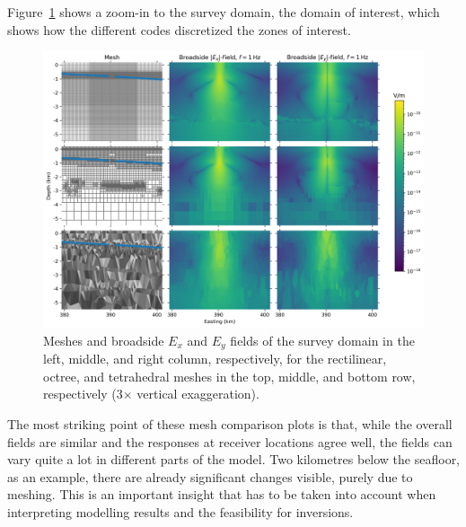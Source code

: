 \documentclass[extra, camera,%
]{gji}
\newlength{\fwidth}
\begin{document}
Figure~\ref{fig:results-marlim_survey} shows a zoom-in to the survey domain, the domain of interest, which shows how the different codes discretized the zones of interest.
%
\begin{figure}
  \centering
  \includegraphics[width=.9\fwidth]{figures/results-marlim_survey.png}
  \caption{Meshes and broadside $E_x$ and $E_y$ fields of the survey domain in the left, middle, and right column, respectively, for the rectilinear, octree, and tetrahedral meshes in the top, middle, and bottom row, respectively (3$\times$ vertical exaggeration).}
  \label{fig:results-marlim_survey}
\end{figure}
%
The most striking point of these mesh comparison plots is that, while the overall fields are similar and the responses at receiver locations agree well, the fields can vary quite a lot in different parts of the model. Two kilometres below the seafloor, as an example, there are already significant changes visible, purely due to meshing. This is an important insight that has to be taken into account when interpreting modelling results and the feasibility for inversions.
\end{document}
